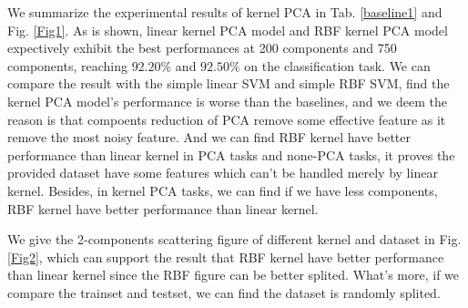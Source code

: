 \documentclass{article}
\begin{document}
We summarize the experimental results of kernel PCA in Tab. \ref{baseline1} and Fig. \ref{Fig1}. As is shown, linear kernel PCA model and RBF kernel PCA model expectively exhibit the best performances at 200 components and 750 components, reaching $92.20\%$ and $92.50\%$ on the classification task. We can compare the result with the simple linear SVM and simple RBF SVM, find the kernel PCA model's performance is worse than the baselines, and we deem the reason is that compoents reduction of PCA remove some effective feature as it remove the most noisy feature. And we can find RBF kernel have better performance than linear kernel in PCA tasks and none-PCA tasks, it proves the provided dataset have some features which can't be handled merely by linear kernel. Besides, in kernel PCA tasks, we can find if we have less components, RBF kernel have better performance than linear kernel.

We give the 2-components scattering figure of different kernel and dataset in Fig. \ref{Fig2}, which can support the result that RBF kernel have better performance than linear kernel since the RBF figure can be better splited. What's more, if we compare the trainset and testset, we can find the dataset is randomly splited.

\begin{table}
	\centering
	\newcommand{\tabincell}[2]{\begin{tabular}{@{}#1@{}}#2\end{tabular}}
	\renewcommand\arraystretch{1.1}
	\caption{Comparison of kernel PCA and baslines in Classification Task}
	\label{baseline1}%
\end{table}
\end{document}
